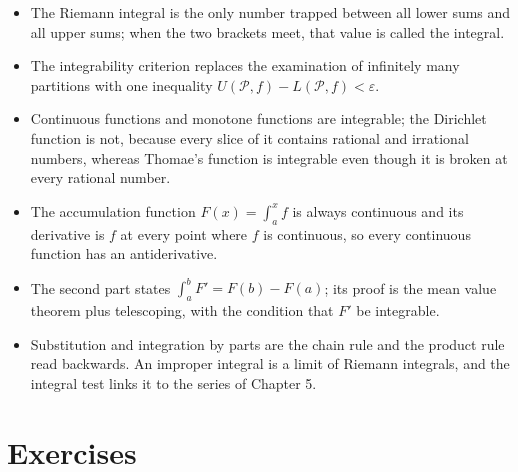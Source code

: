 \begin{ringkasan}
\begin{itemize}
\item The Riemann integral is the only number trapped between all
      lower sums and all upper sums; when the two brackets meet, that value is called
      the integral.
\item The integrability criterion replaces the examination of infinitely many partitions
      with one inequality $U(\mathcal{P},f)-L(\mathcal{P},f)<\varepsilon$.
\item Continuous functions and monotone functions are integrable; the Dirichlet function is not, because
      every slice of it contains rational and irrational numbers, whereas Thomae's function
      is integrable even though it is broken at every rational number.
\item The accumulation function $F(x)=\int_a^xf$ is always continuous and its derivative is $f$ at every
      point where $f$ is continuous, so every continuous function has an antiderivative.
\item The second part states $\int_a^bF'=F(b)-F(a)$; its proof is the mean value theorem
      plus telescoping, with the condition that $F'$ be integrable.
\item Substitution and integration by parts are the chain rule and the product rule
      read backwards. An improper integral is a limit of Riemann integrals, and the integral
      test links it to the series of Chapter 5.
\end{itemize}
\end{ringkasan}

\section{Exercises}

